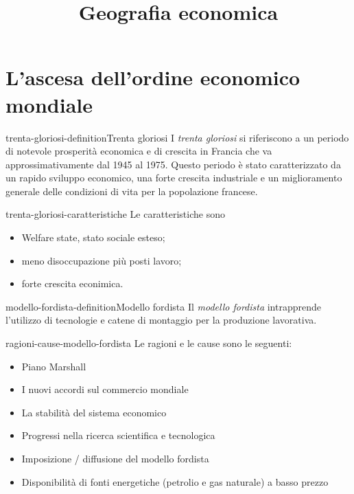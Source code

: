 \documentclass[preview]{standalone}
\begin{document}
\title{Geografia economica}
\genpage

\section{L'ascesa dell'ordine economico mondiale}

\begin{snippetdefinition}{trenta-gloriosi-definition}{Trenta gloriosi}
    I \textit{trenta gloriosi} si riferiscono a un periodo di notevole prosperità economica e di crescita in Francia
    che va approssimativamente dal 1945 al 1975. Questo periodo è stato caratterizzato da un rapido
    sviluppo economico, una forte crescita industriale e un miglioramento generale delle condizioni di
    vita per la popolazione francese.
\end{snippetdefinition}

\begin{snippet}{trenta-gloriosi-caratteristiche}
    Le caratteristiche sono
    \begin{itemize}
        \item Welfare state, stato sociale esteso;
        \item meno disoccupazione più posti lavoro;
        \item forte crescita econimica.
    \end{itemize}
\end{snippet}

\begin{snippetdefinition}{modello-fordista-definition}{Modello fordista}
    Il \textit{modello fordista} intrapprende l'utilizzo di tecnologie e catene di montaggio
    per la produzione lavorativa.
\end{snippetdefinition}

\begin{snippet}{ragioni-cause-modello-fordista}
    Le ragioni e le cause sono le seguenti:
    \begin{itemize}
        \item Piano Marshall
        \item I nuovi accordi sul commercio mondiale
        \item La stabilità del sistema economico
        \item Progressi nella ricerca scientifica e tecnologica
        \item Imposizione / diffusione del modello fordista
        \item Disponibilità di fonti energetiche (petrolio e gas naturale) a basso prezzo
    \end{itemize}
\end{snippet}
\end{document}
